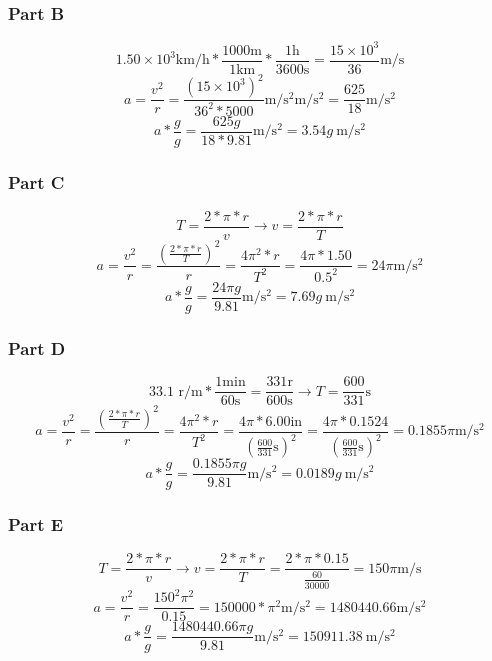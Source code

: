 \documentclass[12pt]{article}
\begin{document}
\subsubsection*{Part B}
\[ 1.50\times10^3 \unit{\kilo\meter/\hour} * \frac{1000\unit{\meter}}{1\unit{\kilo\meter}} * \frac{1\unit{\hour}}{3600\unit{\second}} = \frac{15\times10^3}{36}\unit{\meter/\second} \]
\[ a = \frac{v^2}{r} = \frac{(15\times10^3)^2}{36^2*5000}\unit{\meter/\second^2} \unit{\meter/\second^2} = \frac{625}{18} \unit{\meter/\second^2} \]
\[ a*\frac{g}{g} = \frac{625g}{18*9.81} \unit{\meter/\second^2} = \boxed{3.54g\ \unit{\meter/\second^2}}\]

\subsubsection*{Part C}
\[ T = \frac{2*\pi*r}{v} \rightarrow v = \frac{2*\pi*r}{T} \]
\[ a = \frac{v^2}{r} = \frac{\left(\frac{2*\pi*r}{T}\right)^2}{r} = \frac{4\pi^2*r}{T^2} = \frac{4\pi*1.50}{0.5^2} = 24\pi \unit{\meter/\second^2} \]
\[ a*\frac{g}{g} = \frac{24\pi g}{9.81} \unit{\meter/\second^2} = \boxed{7.69g\ \unit{\meter/\second^2}}\]

\pagebreak
\subsubsection*{Part D}
\[ 33.1 \text{ r/m} * \frac{1\unit{\minute}}{60\unit{\second}} = \frac{331 \text{r}}{600 \unit{\second}} \rightarrow T = \frac{600}{331} \unit{\second} \]
\[ a = \frac{v^2}{r} = \frac{\left(\frac{2*\pi*r}{T}\right)^2}{r} = \frac{4\pi^2*r}{T^2} = \frac{4\pi*6.00\text{in}}{\left(\frac{600}{331} \unit{\second}\right)^2} = \frac{4\pi*0.1524}{\left(\frac{600}{331} \unit{\second}\right)^2} = 0.1855\pi \unit{\meter/\second^2} \]
\[ a*\frac{g}{g} = \frac{0.1855\pi g}{9.81} \unit{\meter/\second^2} = \boxed{0.0189g\ \unit{\meter/\second^2}}\]

\subsubsection*{Part E}
\[ T = \frac{2*\pi*r}{v} \rightarrow v = \frac{2*\pi*r}{T} = \frac{2*\pi*0.15}{\frac{60}{30000}} = 150\pi \unit{\meter/\second}\]
\[ a = \frac{v^2}{r} = \frac{150^2\pi^2}{0.15} = 150000*\pi^2 \unit{\meter/\second^2} = 1480440.66 \unit{\meter/\second^2} \]
\[ a*\frac{g}{g} = \frac{1480440.66\pi g}{9.81} \unit{\meter/\second^2} = \boxed{150911.38\ \unit{\meter/\second^2}}\]
\end{document}
